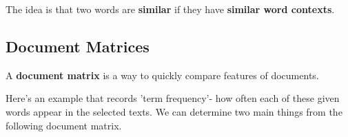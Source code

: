 \documentclass[english, 10pt]{article}
\begin{document}
The idea is that two words are \textbf{similar} if they have \textbf{similar word contexts}.

\subsection{Document Matrices}

A \textbf{document matrix} is a way to quickly compare features of documents.

Here's an example that records 'term frequency'- how often each of these given words appear in the selected texts. We can determine two main things from the following document matrix.\\

{
\centering




\begin{tikzpicture}[x=0.75pt,y=0.75pt,yscale=-1,xscale=1]


\end{tikzpicture}}
\end{document}
